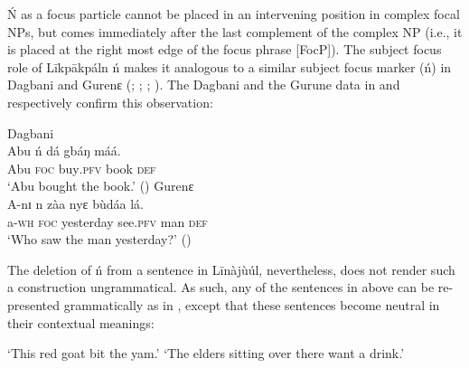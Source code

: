 \documentclass[output=paper,colorlinks,citecolor=brown]{langscibook}
\begin{document}
Ń as a focus particle cannot be placed in an intervening position in complex focal NPs, but comes immediately after the last complement of the complex NP (i.e., it is placed at the right most edge of the focus phrase [FocP]). The subject focus role of Līkpākpáln ń makes it analogous to a similar subject focus marker (ń) in Dagbani and Gurenɛ (\citealt[4]{Dakubu2003}; \citealt[169]{Issah2013Focus}; \citealt[5]{IssahSmith2018}; \citealt[169]{Akrofi-Ansah2014}). The Dagbani and the Gurune data in  and  respectively confirm this observation:

\ea%
    \label{ex:bisilki:10}
    \ea\label{ex:bisilki:10a}
    Dagbani\\
    \gll    Abu	ń	dá		gbáŋ	máá.\\
            Abu	\textsc{foc}	buy\textsc{.pfv}	book	\textsc{def}\\
    \glt    ‘Abu bought the book.’ \hfill (\citealt[5]{IssahSmith2018})
    \ex\label{ex:bisilki:10b}
    Gurenɛ\\
    \gll    A-nɪ	n	zàa		nyɛ		bùdáa	lá.\\
            a\textsc{-wh}	\textsc{foc}	yesterday	see\textsc{.pfv}	man	\textsc{def}\\
    \glt    ‘Who saw the man yesterday?’ \hfill (\citealt[4]{Dakubu2003})
    \z
\z

The deletion of ń from a sentence in Līnàjùúl, nevertheless, does not render such a construction ungrammatical. As such, any of the sentences in  above can be re-presented grammatically as in , except that these sentences become neutral in their contextual meanings:

\ea%
    \label{ex:bisilki:11}
    \jambox*{[neutral]}
    \glt    ‘This red goat bit the yam.’
    \jambox*{[neutral]}
    \glt    ‘The elders sitting over there want a drink.’
    \z
\z
\end{document}
